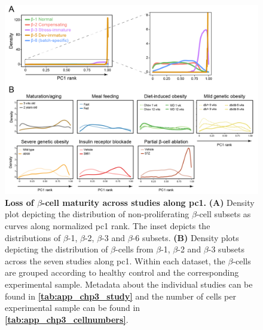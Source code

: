 \begin{figure}[H]
\centering
\includegraphics[width=14cm]{Appendix2/Fig/F3-7-02.png}
\caption[Loss of $\beta$-cell maturity across studies along 1]{\textbf{Loss of $\beta$-cell maturity across studies along \gls{pc}1.} \textbf{(A)} Density plot depicting the distribution of non-proliferating $\beta$-cell subsets as curves along normalized \gls{pc}1 rank. The inset depicts the distributions of $\beta$-1, $\beta$-2, $\beta$-3 and $\beta$-6 subsets. \textbf{(B)} Density plots depicting the distribution of $\beta$-cells from $\beta$-1, $\beta$-2 and $\beta$-3 subsets across the seven studies along \gls{pc}1. Within each dataset, the $\beta$-cells are grouped according to healthy control and the corresponding experimental sample. Metadata about the individual studies can be found in \textbf{\autoref{tab:app_chp3_study}} and the number of cells per experimental sample can be found in \textbf{\autoref{tab:app_chp3_cellnumbers}}.}
\label{fig:app_chp3_pc1}
\end{figure}


